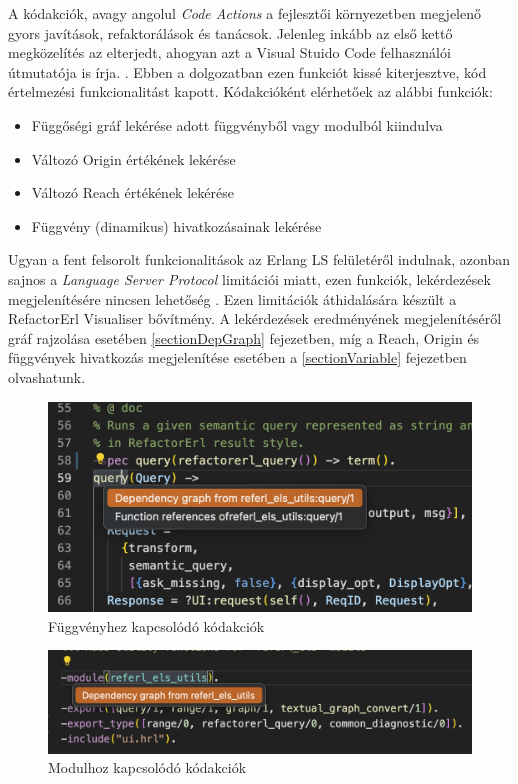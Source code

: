 A kódakciók, avagy angolul \textit{Code Actions} a fejlesztői környezetben megjelenő gyors javítások, refaktorálások és tanácsok. Jelenleg inkább az első kettő megközelítés az elterjedt, ahogyan azt a Visual Stuido Code felhasználói útmutatója is írja. \cite{vscodeCodeActionUserGuide}. Ebben a dolgozatban ezen funkciót kissé kiterjesztve, kód értelmezési funkcionalitást kapott. Kódakcióként elérhetőek az alábbi funkciók:

\begin{itemize}
    \item Függőségi gráf lekérése adott függvényből vagy modulból kiindulva
    \item Változó Origin értékének lekérése
    \item Változó Reach értékének lekérése
    \item Függvény (dinamikus) hivatkozásainak lekérése
\end{itemize}


Ugyan a fent felsorolt funkcionalitások az Erlang LS felületéről indulnak, azonban sajnos a \textit{Language Server Protocol} limitációi miatt, ezen funkciók, lekérdezések megjelenítésére nincsen lehetőség \cite{microsoftLSp}. Ezen limitációk áthidalására készült a RefactorErl Visualiser bővítmény. A lekérdezések eredményének megjelenítéséről gráf rajzolása esetében \ref{sectionDepGraph} fejezetben, míg a Reach, Origin és függvények hivatkozás megjelenítése esetében a \ref{sectionVariable} fejezetben olvashatunk.

\begin{figure}[H]
  \centering
  \includegraphics[width=0.7\linewidth]{images/codeact_function.png}
  \caption{Függvényhez kapcsolódó kódakciók}
  \label{fig:codeact_function}
\end{figure}

\begin{figure}[H]
  \centering
  \includegraphics[width=0.7\linewidth]{images/codeact_module.png}
  \caption{Modulhoz kapcsolódó kódakciók}
  \label{fig:codeact_module}
\end{figure}

